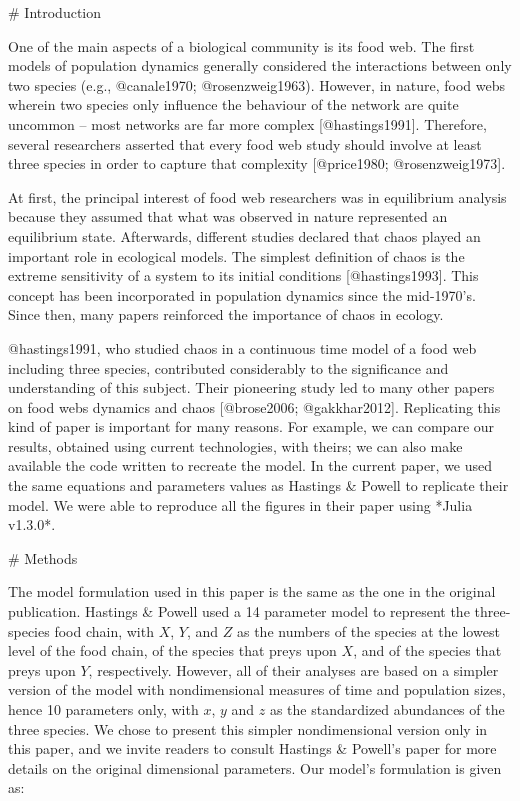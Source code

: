 
# Introduction

One of the main aspects of a biological community is its food web.
The first models of population dynamics generally considered the interactions between only
two species (e.g., @canale1970; @rosenzweig1963). However, in nature, food webs wherein
two species only influence the behaviour of the network are quite uncommon -- most
networks are far more complex [@hastings1991]. Therefore, several researchers asserted
that every food web study should involve at least three species in order to capture that
complexity [@price1980; @rosenzweig1973].

At first, the principal interest of food web researchers was in equilibrium analysis
because they assumed that what was observed in nature represented an equilibrium state.
Afterwards, different studies declared that chaos played an important role in ecological
models. The simplest definition of chaos is the extreme sensitivity of a system to its
initial conditions [@hastings1993]. This concept has been incorporated in population
dynamics since the mid-1970's.
Since then, many papers reinforced the importance of chaos in ecology.

@hastings1991, who studied chaos in a continuous time model of a food web including three
species, contributed considerably to the significance and understanding of this subject.
Their pioneering study led to many other papers on food webs dynamics and chaos
[@brose2006; @gakkhar2012]. Replicating this kind of paper is important for many reasons.
For example, we can compare our results, obtained using current technologies, with theirs;
we can also make available the code written to recreate the model.
In the current paper, we used the same equations and parameters values as Hastings &
Powell to replicate their model.
We were able to reproduce all the figures in their paper using *Julia v1.3.0*.

# Methods

The model formulation used in this paper is the same as the one in the original
publication. Hastings & Powell used a 14 parameter model to represent the three-species
food chain, with $X$, $Y$, and $Z$ as the numbers of the species at the lowest level of
the food chain, of the species that preys upon $X$, and of the species that preys upon
$Y$, respectively.
However, all of their analyses are based on a simpler version of the model with
nondimensional measures of time and population sizes, hence 10 parameters only, with $x$,
$y$ and $z$ as the standardized abundances of the three species.
We chose to present this simpler nondimensional version only in this paper, and we invite
readers to consult Hastings & Powell's paper for more details on the original dimensional
parameters. Our model's formulation is given as:

